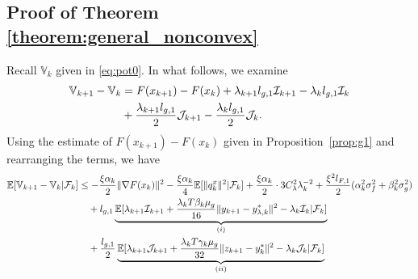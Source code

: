 \subsection{Proof of Theorem \ref{theorem:general_nonconvex}}
\label{sec:pfgeneral}

Recall $\mathbb{V}_k$ given in \eqref{eq:pot0}. In what follows, we examine    %
\begin{align*}
    \mathbb{V}_{k+1} - \mathbb{V}_k &= F(x_{k+1}) - F(x_k) + \lambda_{k+1} l_{g,1} \mathcal{I}_{k+1} - \lambda_k l_{g,1} \mathcal{I}_k \\ &+ \frac{\lambda_{k+1} l_{g,1}}{2} \mathcal{J}_{k+1} - \frac{\lambda_k l_{g,1}}{2} \mathcal{J}_k.
\end{align*}
Using the estimate of $F(x_{k+1}) - F(x_k)$ given in Proposition~\ref{prop:g1} and rearranging the terms, we have
\begin{align*}
    \mathbb{E}[\mathbb{V}_{k+1} - \mathbb{V}_k | \mathcal{F}_k] 
    &\le - \frac{\xi \alpha_k}{2} \|\nabla F(x_k)\|^2  - \frac{\xi \alpha_k}{4} \mathbb{E}[\|q_k^x\|^2  |\mathcal{F}_k] + \frac{\xi \alpha_k}{2} \cdot 3 C_\lambda^2 \lambda_k^{-2} +\frac{\xi^2 l_{F,1}}{2} (\alpha_k^2 \sigma_f^2 + \beta_k^2 \sigma_g^2) \\
    &\quad + l_{g,1} \underbrace{\mathbb{E}[\lambda_{k+1} \mathcal{I}_{k+1}  + \frac{\lambda_k T \beta_k\mu_g }{16} \|y_{k+1} - y_{\lambda, k}^*\|^2  - \lambda_k \mathcal{I}_k |\mathcal{F}_k]}_{(i)}\\
    &\quad + \frac{l_{g,1}}{2} \underbrace{\mathbb{E}[\lambda_{k+1} \mathcal{J}_{k+1} + \frac{\lambda_k T \gamma_k \mu_g }{32} \|z_{k+1} - y_k^*\|^2 - \lambda_k \mathcal{J}_k |\mathcal{F}_k]}_{(ii)}
\end{align*}






